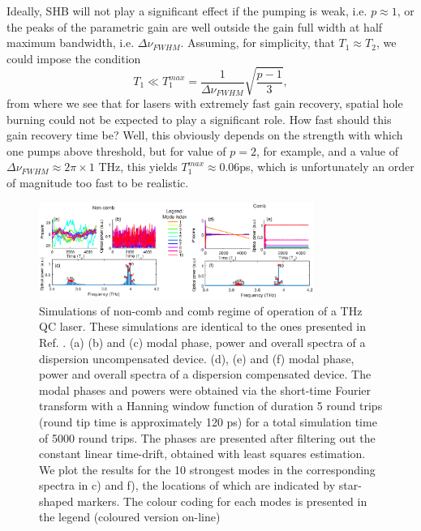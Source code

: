 \documentclass[journal]{IEEEtran}
\begin{document}
	Ideally, SHB will not play a significant effect if the pumping is weak, i.e. $p\approx 1$, or the peaks of the parametric gain are well outside the gain full width at half maximum bandwidth, i.e. $\Delta\nu_{FWHM}$. Assuming, for simplicity, that $T_1 \approx T_2$, we could impose the condition 
	\begin{equation}
	T_1 \ll T_1^{max} = \frac{1}{\Delta\nu_{FWHM}}\sqrt{\frac{p-1}{3}},
	\end{equation}
	from where we see that for lasers with extremely fast gain recovery, spatial hole burning could not be expected to play a significant role. How fast should this gain recovery time be? Well, this obviously depends on the strength with which one pumps above threshold, but for value of $p=2$, for example, and a value of $\Delta\nu_{FWHM}\approx 2\pi\times 1$ THz, this yields $T_1^{max}\approx 0.06 $ps, which is unfortunately an order of magnitude too fast to be realistic. 
		\begin{figure}[tb]
			\centering
			\includegraphics[width=0.8\textwidth]{IMGS/COMB_vs_NOCOMB1}
			\caption{Simulations of non-comb and comb regime of operation of a THz QC laser. These simulations are identical to the ones presented in Ref. \cite{petz2016}. (a) (b) and (c) modal phase, power and overall spectra of a dispersion uncompensated device. (d), (e) and (f) modal phase, power and overall spectra of a dispersion compensated device. The modal phases and powers were obtained via the short-time Fourier transform with a Hanning window function of duration 5 round trips (round tip time is approximately 120 ps) for a total simulation time of 5000 round trips. The phases are presented after filtering out the constant linear time-drift, obtained with least squares estimation. We plot the results for the 10 strongest modes in the corresponding spectra in c) and f), the locations of which are indicated by star-shaped markers.  The colour coding for each modes is presented in the legend (coloured version on-line)}	\label{fig:combnocomb1}
		\end{figure}
	
\end{document}
